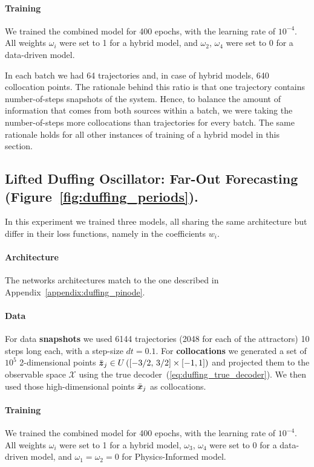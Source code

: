 \paragraph{Training} We trained the combined model for 400 epochs, with the learning rate of $10^{-4}$. All weights $\omega_i$ were set to 1 for a hybrid model, and $\omega_2$, $\omega_4$ were set to 0 for a data-driven model. 

In each batch we had 64 trajectories and, in case of hybrid models, 640 collocation points. The rationale behind this ratio is that one trajectory contains number-of-steps snapshots of the system. Hence, to balance the amount of information that comes from both sources within a batch, we were taking the number-of-steps more collocations than trajectories for every batch. The same rationale holds for all other instances of training of a hybrid model in this section.

\subsection{Lifted Duffing Oscillator: Far-Out Forecasting (Figure~\ref{fig:duffing_periods}).}
\label{appendix:duffing_forecast}
In this experiment we trained three models, all sharing the same architecture but differ in their loss functions, namely in the coefficients $w_i$.

\paragraph{Architecture} The networks architectures match to the one described in Appendix~\ref{appendix:duffing_pinode}.
\paragraph{Data} For data \textbf{snapshots} we used 6144 trajectories (2048 for each of the attractors) 10 steps long each, with a step-size $dt = 0.1$. For \textbf{collocations} we generated a set of $10^5$ 2-dimensional points $\bar{\boldsymbol{z}}_j \in U\left([-3/2,\, 3/2] \times [-1, 1]\right)$ and projected them to the observable space $\mathcal{X}$ using the true decoder~(\ref{eq:duffing_true_decoder}). We then used those high-dimensional points $\bar{\boldsymbol{x}}_j$ as collocations. 

\paragraph{Training} We trained the combined model for 400 epochs, with the learning rate of $10^{-4}$. All weights $\omega_i$ were set to 1 for a hybrid model, $\omega_3$, $\omega_4$ were set to 0 for a data-driven model, and $\omega_1 = \omega_2 = 0$ for Physics-Informed model. 

